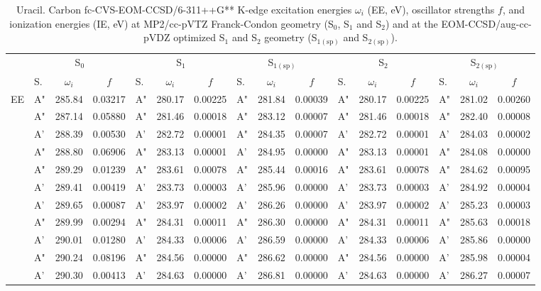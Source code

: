 \documentclass[journal=jctcce,manuscript=article]{achemso}
\begin{document}
\begin{table}
\caption{Uracil.  Carbon fc-CVS-EOM-CCSD/6-311++G** K-edge excitation energies $\omega_i$ (EE, eV), oscillator strengths $f$, and ionization energies (IE, eV) at MP2/cc-pVTZ Franck-Condon geometry (S$_0$, S$_1$ and S$_2$) and at the EOM-CCSD/aug-cc-pVDZ optimized S$_1$ and S$_2$ geometry (S$_{1(\text{sp})}$ and S$_{2(\text{sp})}$).
\label{Tab:Uracil:CCSD:Carbon}}
\scriptsize
\begin{tabular}{l|lcc|lcc|lcc|lcc|lcc}
\cline{2-16}
& \multicolumn{3}{c|}{S$_0$}
& \multicolumn{3}{c|}{S$_1$}  
& \multicolumn{3}{c|}{S$_{1(\text{sp})}$}
& \multicolumn{3}{c|}{S$_2$}
& \multicolumn{3}{c}{S$_{2(\text{sp})}$}
\\
\cline{2-16}
& S. & $\omega_i$ & $f$ 
& S. & $\omega_i$ & $f$ 
& S. & $\omega_i$ & $f$ 
& S. & $\omega_i$ & $f$ 
& S. & $\omega_i$ & $f$\\
\hline
  EE 
& A" & 285.84 & 0.03217 & A" & 280.17 & 0.00225 & A" & 281.84 & 0.00039 & A" & 280.17 & 0.00225 & A" & 281.02 & 0.00260 \\
& A" & 287.14 & 0.05880 & A" & 281.46 & 0.00018 & A" & 283.12 & 0.00007 & A" & 281.46 & 0.00018 & A" & 282.40 & 0.00008 \\
& A' & 288.39 & 0.00530 & A' & 282.72 & 0.00001 & A" & 284.35 & 0.00007 & A' & 282.72 & 0.00001 & A' & 284.03 & 0.00002 \\
& A" & 288.80 & 0.06906 & A" & 283.13 & 0.00001 & A' & 284.95 & 0.00000 & A" & 283.13 & 0.00001 & A" & 284.08 & 0.00000 \\
& A" & 289.29 & 0.01239 & A" & 283.61 & 0.00078 & A" & 285.44 & 0.00016 & A" & 283.61 & 0.00078 & A" & 284.62 & 0.00095 \\
& A' & 289.41 & 0.00419 & A' & 283.73 & 0.00003 & A' & 285.96 & 0.00000 & A' & 283.73 & 0.00003 & A' & 284.92 & 0.00004 \\
& A' & 289.65 & 0.00087 & A' & 283.97 & 0.00002 & A' & 286.26 & 0.00000 & A' & 283.97 & 0.00002 & A' & 285.23 & 0.00003 \\
& A" & 289.99 & 0.00294 & A" & 284.31 & 0.00011 & A" & 286.30 & 0.00000 & A" & 284.31 & 0.00011 & A" & 285.63 & 0.00018 \\
& A' & 290.01 & 0.01280 & A' & 284.33 & 0.00006 & A' & 286.59 & 0.00000 & A' & 284.33 & 0.00006 & A' & 285.86 & 0.00000 \\
& A" & 290.24 & 0.08196 & A" & 284.56 & 0.00000 & A" & 286.62 & 0.00000 & A" & 284.56 & 0.00000 & A' & 285.98 & 0.00004 \\
& A' & 290.30 & 0.00413 & A' & 284.63 & 0.00000 & A' & 286.81 & 0.00000 & A' & 284.63 & 0.00000 & A' & 286.27 & 0.00007 \\

\end{tabular}
\end{table}
\end{document}
